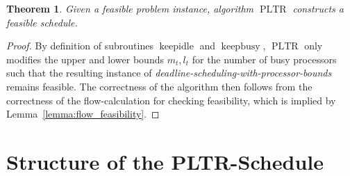 \documentclass[a4paper]{article}
\DeclareMathOperator{\PLTR}{PLTR}
\DeclareMathOperator{\keepidle}{keepidle}
\DeclareMathOperator{\keepbusy}{keepbusy}
\newtheorem{theorem}{Theorem}
\begin{document}
\begin{theorem}\label{theorem:feasibility}
  Given a feasible problem instance, algorithm $\PLTR$ constructs a feasible schedule.
\end{theorem}
\begin{proof}
  By definition of subroutines $\keepidle$ and $\keepbusy$, $\PLTR$ only modifies the upper and lower bounds $m_t, l_t$ for the number of busy processors such that the resulting instance of \emph{deadline-scheduling-with-processor-bounds} remains feasible.
  The correctness of the algorithm then follows from the correctness of the flow-calculation for checking feasibility, which is implied by Lemma~\ref{lemma:flow_feasibility}.
\end{proof}

\section{Structure of the PLTR-Schedule}\label{section:structure}
\end{document}
